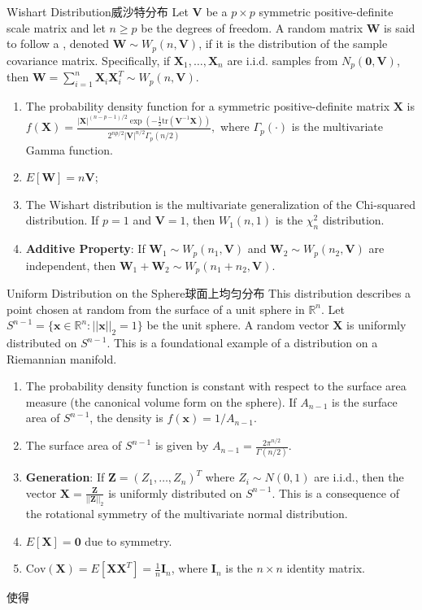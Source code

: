 \documentclass[../main.tex]{subfiles}
\begin{document}
\begin{proposition}{Wishart Distribution}{威沙特分布}
Let $\mathbf{V}$ be a $p \times p$ symmetric positive-definite scale matrix and let $n \ge p$ be the degrees of freedom. A random matrix $\mathbf{W}$ is said to follow a , denoted $\mathbf{W} \sim W_p(n, \mathbf{V})$, if it is the distribution of the sample covariance matrix. Specifically, if $\mathbf{X}_1, \ldots, \mathbf{X}_n$ are i.i.d. samples from $N_p(\mathbf{0}, \mathbf{V})$, then $\mathbf{W} = \sum_{i=1}^n \mathbf{X}_i \mathbf{X}_i^T \sim W_p(n, \mathbf{V})$.
\begin{enumerate}
\item The probability density function for a symmetric positive-definite matrix $\mathbf{X}$ is
$f(\mathbf{X}) = \frac{|\mathbf{X}|^{(n-p-1)/2} \exp\left(-\frac{1}{2}\text{tr}(\mathbf{V}^{-1}\mathbf{X})\right)}{2^{np/2} |\mathbf{V}|^{n/2} \Gamma_p(n/2)},$
where $\Gamma_p(\cdot)$ is the multivariate Gamma function.
\item $E[\mathbf{W}] = n\mathbf{V}$;
\item The Wishart distribution is the multivariate generalization of the Chi-squared distribution. If $p=1$ and $\mathbf{V}=1$, then $W_1(n,1)$ is the $\chi^2_n$ distribution.
\item \textbf{Additive Property}: If $\mathbf{W}_1 \sim W_p(n_1, \mathbf{V})$ and $\mathbf{W}_2 \sim W_p(n_2, \mathbf{V})$ are independent, then $\mathbf{W}_1 + \mathbf{W}_2 \sim W_p(n_1+n_2, \mathbf{V})$.
\end{enumerate}
\end{proposition}
\begin{proposition}{Uniform Distribution on the Sphere}{球面上均匀分布}
This distribution describes a point chosen at random from the surface of a unit sphere in $\mathbb{R}^n$. Let $S^{n-1} = \{\mathbf{x} \in \mathbb{R}^n : ||\mathbf{x}||_2 = 1\}$ be the unit sphere. A random vector $\mathbf{X}$ is uniformly distributed on $S^{n-1}$. This is a foundational example of a distribution on a Riemannian manifold.
\begin{enumerate}
\item The probability density function is constant with respect to the surface area measure (the canonical volume form on the sphere). If $A_{n-1}$ is the surface area of $S^{n-1}$, the density is $f(\mathbf{x}) = 1/A_{n-1}$.
\item The surface area of $S^{n-1}$ is given by $A_{n-1} = \frac{2\pi^{n/2}}{\Gamma(n/2)}$.
\item \textbf{Generation}: If $\mathbf{Z} = (Z_1, \ldots, Z_n)^T$ where $Z_i \sim N(0,1)$ are i.i.d., then the vector $\mathbf{X} = \frac{\mathbf{Z}}{||\mathbf{Z}||_2}$ is uniformly distributed on $S^{n-1}$. This is a consequence of the rotational symmetry of the multivariate normal distribution.
\item $E[\mathbf{X}] = \mathbf{0}$ due to symmetry.
\item $\text{Cov}(\mathbf{X}) = E[\mathbf{X}\mathbf{X}^T] = \frac{1}{n}\mathbf{I}_n$, where $\mathbf{I}_n$ is the $n \times n$ identity matrix.
\end{enumerate}
\end{proposition}

\begin{theorem}{}{}
    使得
\end{theorem}
\end{document}
